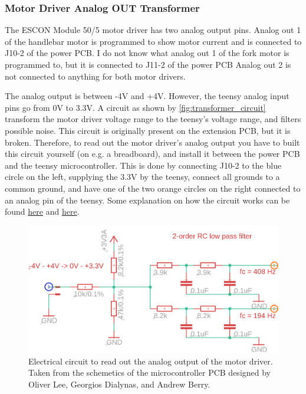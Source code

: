 \subsubsection{Motor Driver Analog OUT Transformer} \label{sec:motor_driver_read_out}
The ESCON Module 50/5 motor driver has two analog output pins.
Analog out 1 of the handlebar motor is programmed to show motor current and is connected to J10-2 of the power PCB.
I do not know what analog out 1 of the fork motor is programmed to, but it is connected to J11-2 of the power PCB
Analog out 2 is not connected to anything for both motor drivers.

The analog output is between -4V and +4V.
However, the teensy analog input pins go from 0V to 3.3V.
A circuit as shown by \autoref{fig:transformer_circuit} transform the motor driver voltage range to the teensy's voltage range, and filters possible noise.
This circuit is originally present on the extension PCB, but it is broken.
Therefore, to read out the motor driver's analog output you have to built this circuit yourself (on e.g. a breadboard), and install it between the power PCB and the teensy microcontroller. 
This is done by connecting J10-2 to the blue circle on the left, supplying the 3.3V by the teensy, connect all grounds to a common ground, and have one of the two orange circles on the right connected to an analog pin of the teensy.
Some explanation on how the circuit works can be found \href{https://electronics.stackexchange.com/questions/115502/convert-from-a-specifc-range-to-another-one#}{here} and \href{https://www.youtube.com/watch?v=mUbACZP-8Sw}{here}.
\begin{figure}
    \centering
    \includegraphics[width=\textwidth]{Img/motor_driver_to_teensy_voltage_transformer.PNG}
    \caption{Electrical circuit to read out the analog output of the motor driver. Taken from the schemetics of the microcontroller PCB designed by Oliver Lee, Georgios Dialynas, and Andrew Berry.}
    \label{fig:transformer_circuit}
\end{figure}



